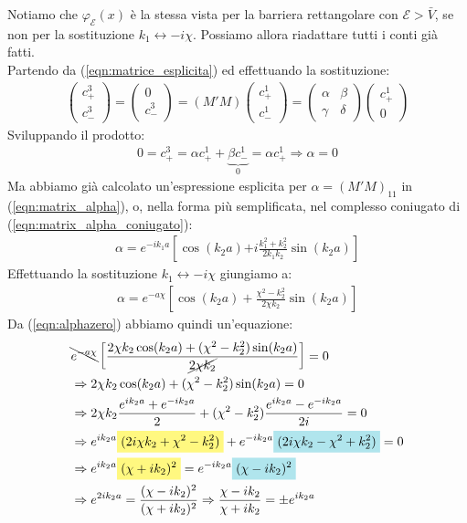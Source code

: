 \documentclass[../../FisicaTeorica.tex]{subfiles}
\begin{document}
Notiamo che $\varphi_\mathcal{E}(x)$ è la stessa vista per la barriera rettangolare con $\mathcal{E} > \bar{V}$, se non per la sostituzione $k_1 \leftrightarrow -i\chi$. Possiamo allora riadattare tutti i conti già fatti.\\
Partendo da (\ref{eqn:matrice_esplicita}) ed effettuando la sostituzione:
\begin{align*}
\begin{pmatrix}
c^3_+\\
c^3_-
\end{pmatrix}
=
\begin{pmatrix}0 \\ c^3_- \end{pmatrix} = (M' M) \begin{pmatrix} c^1_+ \\ c^1_- \end{pmatrix} =\begin{pmatrix} \alpha & \beta\\ \gamma & \delta \end{pmatrix} \begin{pmatrix} c^1_+ \\ 0 \end{pmatrix}
\end{align*}
Sviluppando il prodotto:
\begin{align}
0 = c^3_+ = \alpha c^1_+ + \underbrace{\beta c^1_-}_{0} =\alpha c^1_+ \Rightarrow \alpha = 0
\label{eqn:alphazero}
\end{align}
Ma abbiamo già calcolato un'espressione esplicita per $\alpha = (M'M)_{11}$ in (\ref{eqn:matrix_alpha}), o, nella forma più semplificata, nel complesso coniugato di (\ref{eqn:matrix_alpha_coniugato}):
\begin{align*}
\alpha = e^{\bm{-}ik_1 a}\left[\cos(k_2a) \bm{+} i\frac{k_1^2 + k_2^2}{2k_1 k_2}\sin(k_2a ) \right]
\end{align*}
Effettuando la sostituzione $k_1 \leftrightarrow -i\chi$ giungiamo a:
\begin{align*}
\alpha = e^{-a\chi} \left[\cos(k_2 a) + \frac{\chi^2-k_2^2}{2\chi k_2} \sin(k_2a )\right]
\end{align*}
Da (\ref{eqn:alphazero}) abbiamo quindi un'equazione:
\begin{align}\nonumber
&\bcancel{e^{-a\chi}}\left[\frac{2\chi k_2 \cos(k_2a) + (\chi^2-k_2^2)\sin(k_2a)}{\cancel{2\chi k_2}} \right]=0\\ \nonumber
&\Rightarrow 2\chi k_2 \cos(k_2a) + (\chi^2-k_2^2)\sin(k_2 a) = 0\\ \nonumber
&\Rightarrow  2\chi k_2 \frac{e^{ik_2 a} + e^{-ik_2 a}}{2} + (\chi^2-k_2^2) \frac{e^{ik_2a} - e^{-ik_2a}}{2i} =0\\ \nonumber
&\Rightarrow e^{ik_2 a}\hlc{Yellow}{(2i\chi k_2 + \chi^2 -k_2^2 )} + e^{-ik_2 a} \hlc{SkyBlue}{(2i\chi k_2 - \chi^2 +k_2^2)}=0\\ \nonumber
&\Rightarrow e^{ik_2 a}\hlc{Yellow}{(\chi+ik_2)^2 }= e^{-ik_2 a}\hlc{SkyBlue}{(\chi-ik_2)^2}\\
&\Rightarrow e^{2ik_2 a} = \frac{(\chi-ik_2)^2}{(\chi+ik_2)^2}\Rightarrow \frac{\chi-ik_2}{\chi+ik_2}= \pm e^{ik_2a}
\label{eqn:divisione_matrix}
\end{align}
\end{document}
